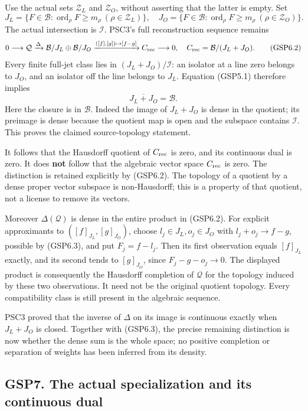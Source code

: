 Use the actual sets \(\mathscr Z_L\) and \(\mathscr Z_O\), without
asserting that the latter is empty. Set \[
J_L=\{F\in\mathcal B:\operatorname{ord}_\rho F\ge m_\rho\ (\rho\in\mathscr Z_L)\},
\quad
J_O=\{F\in\mathcal B:\operatorname{ord}_\rho F\ge m_\rho\ (\rho\in\mathscr Z_O)\}.
\tag{GSP6.1}
\] The actual intersection is \(\mathcal I\). PSC3's full reconstruction
sequence remains \[
0\longrightarrow\mathcal Q\xrightarrow{\Delta}
\mathcal B/J_L\oplus\mathcal B/J_O
\xrightarrow{([f],[g])\mapsto[f-g]}C_{\rm rec}\longrightarrow0,
\quad C_{\rm rec}=\mathcal B/(J_L+J_O).
\tag{GSP6.2}
\] Every finite full-jet class lies in \((J_L+J_O)/\mathcal I\): an
isolator at a line zero belongs to \(J_O\), and an isolator off the line
belongs to \(J_L\). Equation (GSP5.1) therefore implies \[
\boxed{\overline{J_L+J_O}=\mathcal B.}
\tag{GSP6.3}
\] Here the closure is in \(\mathcal B\). Indeed the image of
\(J_L+J_O\) is dense in the quotient; its preimage is dense because the
quotient map is open and the subspace contains \(\mathcal I\). This
proves the claimed source-topology statement.

It follows that the Hausdorff quotient of \(C_{\rm rec}\) is zero, and
its continuous dual is zero. It does \textbf{not} follow that the
algebraic vector space \(C_{\rm rec}\) is zero. The distinction is
retained explicitly by (GSP6.2). The topology of a quotient by a dense
proper vector subspace is non-Hausdorff; this is a property of that
quotient, not a license to remove its vectors.

Moreover \(\Delta(\mathcal Q)\) is dense in the entire product in
(GSP6.2). For explicit approximants to \(([f]_{J_L},[g]_{J_O})\), choose
\(l_j\in J_L,o_j\in J_O\) with \(l_j+o_j\to f-g\), possible by (GSP6.3),
and put \(F_j=f-l_j\). Then its first observation equals \([f]_{J_L}\)
exactly, and its second tends to \([g]_{J_O}\), since \(F_j-g-o_j\to0\).
The displayed product is consequently the Hausdorff completion of
\(\mathcal Q\) for the topology induced by these two observations. It
need not be the original quotient topology. Every compatibility class is
still present in the algebraic sequence.

PSC3 proved that the inverse of \(\Delta\) on its image is continuous
exactly when \(J_L+J_O\) is closed. Together with (GSP6.3), the precise
remaining distinction is now whether the dense sum is the whole space;
no positive completion or separation of weights has been inferred from
its density.

\subsection{GSP7. The actual specialization and its continuous
dual}\label{gsp7.-the-actual-specialization-and-its-continuous-dual}

